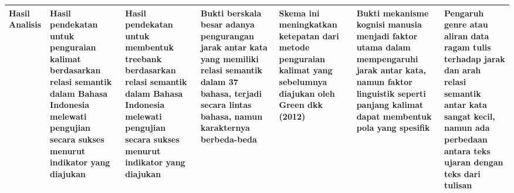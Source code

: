 \begin{landscape}
\begin{table}[htbp]
\begin{scriptsize}
\begin{center}
\begin{tabular}{| p{2cm} | p{3cm} | p{3cm} | p{3cm} | p{3cm} | p{3cm} | p{3cm} |}
Hasil Analisis & Hasil pendekatan untuk penguraian kalimat berdasarkan relasi semantik dalam Bahasa Indonesia melewati pengujian secara sukses menurut indikator yang diajukan & Hasil pendekatan untuk membentuk treebank berdasarkan relasi semantik dalam Bahasa Indonesia melewati pengujian secara sukses menurut indikator yang diajukan & Bukti berskala besar adanya pengurangan jarak antar kata yang memiliki relasi semantik dalam 37 bahasa, terjadi secara lintas bahasa, namun karakternya berbeda-beda & Skema ini meningkatkan ketepatan dari metode penguraian kalimat yang sebelumnya diajukan oleh Green dkk (2012) & Bukti mekanisme kognisi manusia menjadi faktor utama dalam mempengaruhi jarak antar kata, namun faktor linguistik seperti panjang kalimat dapat membentuk pola yang spesifik & Pengaruh genre atau aliran data ragam tulis terhadap jarak dan arah relasi semantik antar kata sangat kecil, namun ada perbedaan antara teks ujaran dengan teks dari tulisan \\ \hline

\end{tabular}
\end{center}
\end{scriptsize}
\end{table} 
\end{landscape}
\pagestyle{plain}


